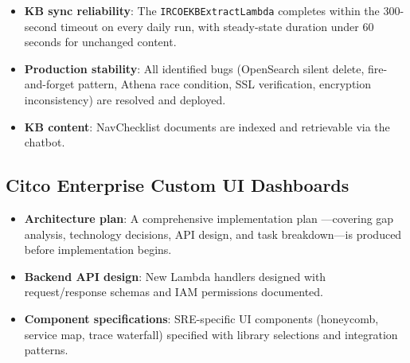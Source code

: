 \begin{itemize}
    \item \textbf{KB sync reliability}: The \texttt{IRCOEKBExtractLambda}
          completes within the 300-second timeout on every daily run,
          with steady-state duration under 60 seconds for unchanged
          content.

    \item \textbf{Production stability}: All identified bugs (OpenSearch
          silent delete, fire-and-forget pattern, Athena race condition,
          SSL verification, encryption inconsistency) are resolved and
          deployed.

    \item \textbf{KB content}: NavChecklist documents are indexed and
          retrievable via the chatbot.
\end{itemize}


\subsection{Citco Enterprise Custom UI Dashboards}

\begin{itemize}
    \item \textbf{Architecture plan}: A comprehensive implementation plan
          ---covering gap analysis, technology decisions, API design, and
          task breakdown---is produced before implementation begins.

    \item \textbf{Backend API design}: New Lambda handlers designed
          with request/response schemas and IAM permissions documented.

    \item \textbf{Component specifications}: SRE-specific UI components
          (honeycomb, service map, trace waterfall) specified with library
          selections and integration patterns.
\end{itemize}





\FloatBarrier

